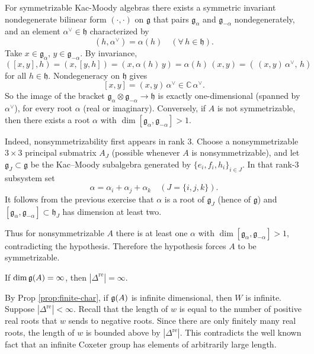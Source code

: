 \documentclass[12pt]{article}
\begin{document}
\begin{solution}
    For symmetrizable Kac-Moody algebras there exists a symmetric invariant nondegenerate bilinear form $(\cdot,\cdot)$ on $\mathfrak{g}$ that pairs $\mathfrak{g}_\alpha$ and $\mathfrak{g}_{-\alpha}$ nondegenerately, and an element $\alpha^\vee\in\mathfrak{h}$ characterized by
    \[
        (h,\alpha^\vee)=\alpha(h) \quad (\forall\,h\in\mathfrak{h}).
    \]
    Take $x\in\mathfrak{g}_\alpha$, $y\in\mathfrak{g}_{-\alpha}$. By invariance,
    \[
        ([x,y],h)=(x,[y,h])=(x,\alpha(h)\,y)=\alpha(h)\,(x,y)=(\,(x,y)\,\alpha^\vee,\,h)
    \]
    for all $h\in\mathfrak{h}$. Nondegeneracy on $\mathfrak{h}$ gives
    \[
        [x,y]=(x,y)\,\alpha^\vee \in \mathbb{C}\,\alpha^\vee.
    \]
    So the image of the bracket $\mathfrak{g}_\alpha\otimes \mathfrak{g}_{-\alpha}\to \mathfrak{h}$ is exactly one-dimensional (spanned by $\alpha^\vee$), for every root $\alpha$ (real or imaginary). Conversely, if $A$ is not symmetrizable, then there exists a root $\alpha$ with $\dim[\mathfrak{g}_\alpha,\mathfrak{g}_{-\alpha}]>1$.

    Indeed, nonsymmetrizability first appears in rank 3. Choose a nonsymmetrizable $3\times3$ principal submatrix $A_J$ (possible whenever $A$ is nonsymmetrizable), and let $\mathfrak{g}_J\subset \mathfrak{g}$ be the Kac–Moody subalgebra generated by $\{e_i,f_i,h_i\}_{i\in J}$. In that rank-3 subsystem set
    \[
        \alpha=\alpha_i+\alpha_j+\alpha_k\quad (J=\{i,j,k\}).
    \]
    It follows from the previous exercise that $\alpha$ is a root of $\mathfrak{g}_J$ (hence of $\mathfrak{g}$) and $[\mathfrak{g}_\alpha,\mathfrak{g}_{-\alpha}]\subset \mathfrak{h}_J$ has dimension at least two.

    Thus for nonsymmetrizable $A$ there is at least one $\alpha$ with $\dim[\mathfrak{g}_\alpha,\mathfrak{g}_{-\alpha}]>1$, contradicting the hypothesis. Therefore the hypothesis forces $A$ to be symmetrizable.
\end{solution}

\begin{exercise}
    If $\dim \mathfrak{g}(A) = \infty$, then $|\Delta^{\mathrm{re}}| = \infty$.
\end{exercise}

\begin{solution}
    By Prop \ref{prop:finite-char}, if $\mathfrak{g}(A)$ is infinite dimensional, then $W$ is infinite. Suppose $|\Delta^{\mathrm{re}}|<\infty$. Recall that the length of $w$ is equal to the number of positive real roots that $w$ sends to negative roots. Since there are only finitely many real roots, the length of $w$ is bounded above by $|\Delta^{\mathrm{re}}|$. This contradicts the well known fact that an infinite Coxeter group has elements of arbitrarily large length.
\end{solution}
\end{document}
